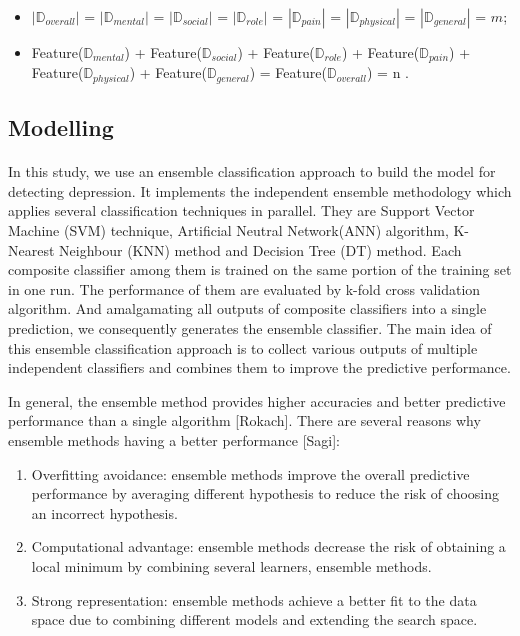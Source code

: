 \documentclass[runningheads]{llncs}
\begin{document}
\begin{itemize}
  \item $|\mathbb{D}_{overall}|$ = $|\mathbb{D}_{mental}|$ = $|\mathbb{D}_{social}|$ = $|\mathbb{D}_{role}|$ = $|\mathbb{D}_{pain}|$ = $|\mathbb{D}_{physical}|$ = $|\mathbb{D}_{general}|$ = $m$;
  \item Feature($\mathbb{D}_{mental}$) + Feature($\mathbb{D}_{social}$) + Feature($\mathbb{D}_{role}$) + Feature($\mathbb{D}_{pain}$) + Feature($\mathbb{D}_{physical}$) + Feature($\mathbb{D}_{general}$) = Feature($\mathbb{D}_{overall}$) = n .
\end{itemize}
%
%
\subsection{Modelling}
%
\paragraph{}
In this study, we use an ensemble classification approach to build the model for detecting depression. It implements the independent ensemble methodology which applies several classification techniques in parallel. They are Support Vector Machine (SVM) technique, Artificial Neutral Network(ANN) algorithm, K-Nearest Neighbour (KNN) method and Decision Tree (DT) method. Each composite classifier among them is trained on the same portion of the training set in one run. The performance of them are evaluated by k-fold cross validation algorithm. And amalgamating all outputs of composite classifiers into a single prediction, we consequently generates the ensemble classifier. The main idea of this ensemble classification approach is to collect various outputs of multiple independent classifiers and combines them to improve the predictive performance. 

In general, the ensemble method provides higher accuracies and better predictive performance than a single algorithm [Rokach]. There are several reasons why ensemble methods having a better performance [Sagi]: 
\renewcommand\labelitemii{$\square$}
\begin{enumerate}[label=(\roman*)]
  \item Overfitting avoidance: ensemble methods improve the overall predictive performance by averaging different hypothesis to reduce the risk of choosing an incorrect hypothesis.  
  \item \vspace{3mm} Computational advantage: ensemble methods decrease the risk of obtaining a local minimum by combining several learners, ensemble methods.
  \item \vspace{3mm}Strong representation: ensemble methods achieve a better fit to the data space due to combining different models and extending the search space.
\end{enumerate}
\end{document}

